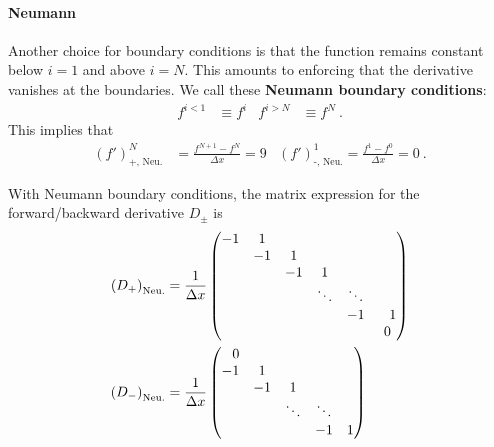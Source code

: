 \documentclass[12pt, oneside]{report}    %
\begin{document}
\paragraph{Neumann} Another choice for boundary conditions is that the function remains constant below $i=1$ and above $i=N$. This amounts to enforcing that the derivative vanishes at the boundaries. We call these \textbf{Neumann boundary conditions}:
\begin{align}
    f^{i<1} &\equiv f^i
    &
    f^{i>N} &\equiv f^N \ .
\end{align}
This implies that 
\begin{align}
  (f')^N_\text{+, Neu.} &= \frac{f^{N+1} - f^N}{\Delta x} 
  = 
  9
  &
 (f')^1_\text{-, Neu.} = \frac{f^{1} - f^0}{\Delta x} 
  = 
  0
  \ .
\end{align}
\begin{example}
With Neumann boundary conditions, the matrix expression for the forward/backward derivative $D_\pm$ is
\begin{align}
    \left(D_+\right)_\text{Neu.}
    &=
    \frac{1}{\Delta x}
    \begin{pmatrix}
        -1 & 1 & & &  \\
        & -1 & 1 & &  \\
        & & -1 & 1 &  \\
        & & & \ddots & \ddots &  \\
        & & & & -1 & \pp 1 \\
        & & & & & 0 
    \end{pmatrix}
    \\
    \left(D_-\right)_\text{Neu.}
    &=
    \frac{1}{\Delta x}
    \begin{pmatrix}
        \pp 0 & & & &  \\
         -1 & 1 & &  \\
        & -1 & 1 &  \\
         & & \ddots & \ddots &  \\
        & & & -1 &  1 
    \end{pmatrix}
\end{align}
\end{example}
\end{document}
